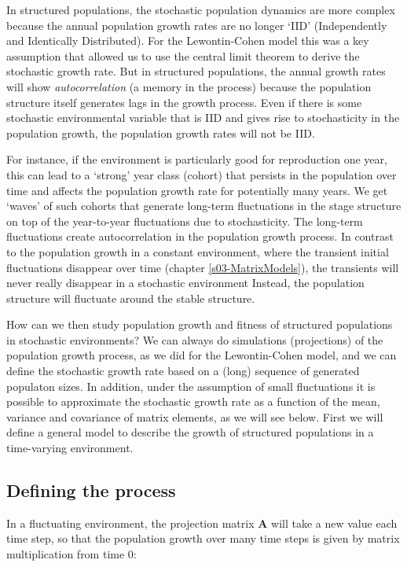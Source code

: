 \documentclass[
]{book}
\begin{document}
In structured populations, the stochastic population dynamics are more complex because the annual population growth rates are no longer `IID' (Independently and Identically Distributed). For the Lewontin-Cohen model this was a key assumption that allowed us to use the central limit theorem to derive the stochastic growth rate. But in structured populations, the annual growth rates will show \emph{autocorrelation} (a memory in the process) because the population structure itself generates lags in the growth process. Even if there is some stochastic environmental variable that is IID and gives rise to stochasticity in the population growth, the population growth rates will not be IID.

For instance, if the environment is particularly good for reproduction one year, this can lead to a `strong' year class (cohort) that persists in the population over time and affects the population growth rate for potentially many years. We get `waves' of such cohorts that generate long-term fluctuations in the stage structure on top of the year-to-year fluctuations due to stochasticity. The long-term fluctuations create autocorrelation in the population growth process. In contrast to the population growth in a constant environment, where the transient initial fluctuations disappear over time (chapter \ref{s03-MatrixModels}), the transients will never really disappear in a stochastic environment Instead, the population structure will fluctuate around the stable structure.

How can we then study population growth and fitness of structured populations in stochastic environments? We can always do simulations (projections) of the population growth process, as we did for the Lewontin-Cohen model, and we can define the stochastic growth rate based on a (long) sequence of generated populaton sizes. In addition, under the assumption of small fluctuations it is possible to approximate the stochastic growth rate as a function of the mean, variance and covariance of matrix elements, as we will see below. First we will define a general model to describe the growth of structured populations in a time-varying environment.

\hypertarget{defining-the-process-1}{%
\subsection{Defining the process}\label{defining-the-process-1}}

In a fluctuating environment, the projection matrix \(\mathbf{A}\) will take a new value each time step, so that the population growth over many time steps is given by matrix multiplication from time 0:
\end{document}

